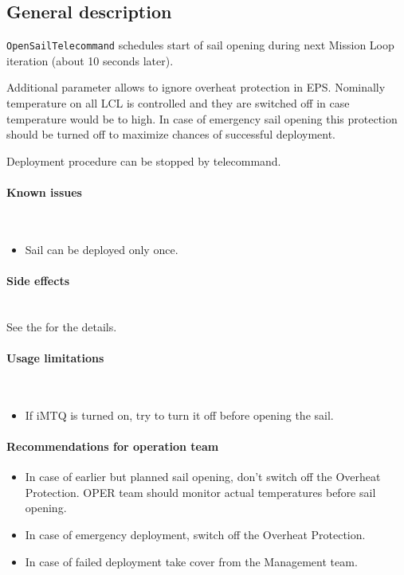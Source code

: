 

\subsection{General description}


\texttt{OpenSailTelecommand} schedules start of sail opening during next Mission Loop iteration (about 10 seconds later). 

Additional parameter allows to ignore overheat protection in EPS.
Nominally temperature on all LCL is controlled and they are switched off in case temperature would be to high. In case of emergency sail opening this protection should be turned off to maximize chances of successful deployment.

Deployment procedure can be stopped by  telecommand.

\paragraph{Known issues} \mbox{} \\
\begin{itemize}
	\item Sail can be deployed only once. 
\end{itemize}

\paragraph{Side effects} \mbox{} \\
See the  for the details.

\paragraph{Usage limitations} \mbox{} \\
\begin{itemize}
	\item If iMTQ is turned on, try to turn it off before opening the sail.
\end{itemize}

\paragraph{Recommendations for operation team}
\begin{itemize}
    \item In case of earlier but planned sail opening, don't switch off the Overheat Protection. OPER team should monitor actual temperatures before sail opening.
	\item In case of emergency deployment, switch off the Overheat Protection.
	\item In case of failed deployment take cover from the Management team.
\end{itemize}


